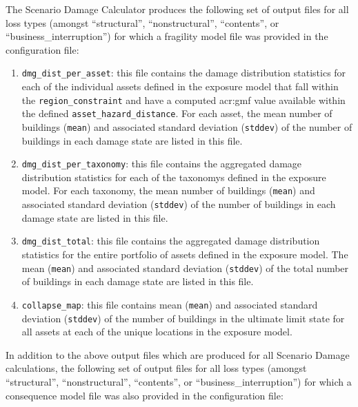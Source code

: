 The Scenario Damage Calculator produces the following set of output files for
all loss types (amongst ``structural'', ``nonstructural'', ``contents'', or
``business\_interruption'') for which a fragility model file was provided in
the configuration file:

\begin{enumerate}

  \item \Verb+dmg_dist_per_asset+: this file contains the damage distribution
    statistics for each of the individual \glspl{asset} defined in the
    \gls{exposure model} that fall within the \Verb+region_constraint+ and have
    a computed \gls{acr:gmf} value available within the defined
    \Verb+asset_hazard_distance+. For each \gls{asset}, the mean number of
    buildings (\Verb+mean+) and associated standard deviation (\Verb+stddev+)
    of the number of buildings in each damage state are listed in this file.

  \item \Verb+dmg_dist_per_taxonomy+: this file contains the aggregated damage
    distribution statistics for each of the \glspl{taxonomy} defined in the
    \gls{exposure model}. For each \gls{taxonomy}, the mean number of
    buildings (\Verb+mean+) and associated standard deviation (\Verb+stddev+)
    of the number of buildings in each damage state are listed in this file.

  \item \Verb+dmg_dist_total+: this file contains the aggregated damage
    distribution statistics for the entire portfolio of \glspl{asset} defined
    in the \gls{exposure model}. The mean (\Verb+mean+) and associated standard
    deviation (\Verb+stddev+) of the total number of buildings in each
    damage state are listed in this file.

  \item \Verb+collapse_map+: this file contains mean (\Verb+mean+) and
    associated standard deviation (\Verb+stddev+) of the number of buildings
    in the ultimate limit state for all \glspl{asset} at each of the unique
    locations in the \gls{exposure model}.

\end{enumerate}

In addition to the above output files which are produced for all Scenario
Damage calculations, the following set of output files for all loss types
(amongst ``structural'', ``nonstructural'', ``contents'', or
``business\_interruption'') for which a consequence model file was also
provided in the configuration file:

